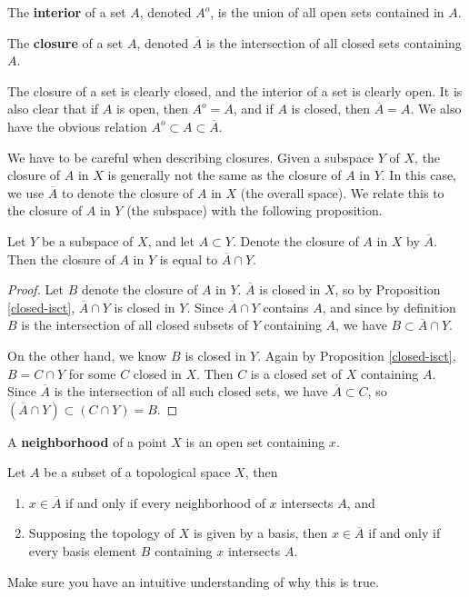 \documentclass[10pt]{report}
\begin{document}
\begin{defn}
	The \textbf{interior} of a set $A$, denoted $A^o$, is the union of all open sets contained in $A$.

	The \textbf{closure} of a set $A$, denoted $\overline{A}$ is the intersection of all closed sets containing $A$.
\end{defn}

The closure of a set is clearly closed, and the interior of a set is clearly open. It is also clear that if $A$ is open, then $A^o = A$, and if $A$ is closed, then $\overline{A}=A$. We also have the obvious relation $A^o \subset A \subset \overline{A}$.

We have to be careful when describing closures. Given a subspace $Y$ of $X$, the closure of $A$ in $X$ is generally not the same as the closure of $A$ in $Y$. In this case, we use $\overline{A}$ to denote the closure of $A$ in $X$ (the overall space). We relate this to the closure of $A$ in $Y$ (the subspace) with the following proposition.

\begin{prop}
	Let $Y$ be a subspace of $X$, and let $A \subset Y$. Denote the closure of $A$ in $X$ by $\overline{A}$. Then the closure of $A$ in $Y$ is equal to $\overline{A} \cap Y$.
\end{prop}
\begin{proof}
	Let $B$ denote the closure of $A$ in $Y$. $\overline{A}$ is closed in $X$, so by Proposition \ref{closed-isct}, $\overline{A} \cap Y$ is closed in $Y$. Since $\overline{A} \cap Y$ contains $A$, and since by definition $B$ is the intersection of all closed subsets of $Y$ containing $A$, we have $B \subset \overline{A}\cap Y$.

	On the other hand, we know $B$ is closed in $Y$. Again by Proposition \ref{closed-isct}, $B = C \cap Y$ for some $C$ closed in $X$. Then $C$ is a closed set of $X$ containing $A$. Since $\overline{A}$ is the intersection of all such closed sets, we have $\overline{A} \subset C$, so $(\overline{A} \cap Y) \subset (C \cap Y) = B$.
\end{proof}

\begin{defn}
A \textbf{neighborhood} of a point $X$ is an open set containing $x$.
\end{defn}

\begin{thrm}
	\label{thrm:nhood-closure}
Let $A$ be a subset of a topological space $X$, then
\begin{enumerate}
	\item $x \in \overline{A}$ if and only if every neighborhood of $x$ intersects $A$, and
	\item Supposing the topology of $X$ is given by a basis, then $x \in \overline{A}$ if and only if every basis element $B$ containing $x$ intersects $A$.
\end{enumerate}
\end{thrm}
{\color{red}Make sure you have an intuitive understanding of why this is true.}
\end{document}
